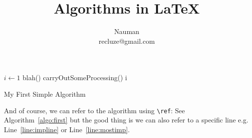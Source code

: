 \documentclass{article}
\begin{document}
\title{Algorithms in \LaTeX}
\author{Nauman \\ recluze@gmail.com}
\maketitle



\begin{algorithm}
\begin{algorithmic}[2]
  \STATE $i\gets1$
\ELSE 
   \label{line:impline}
     \STATE blah()
     \STATE carryOutSomeProcessing() \label{line:mostimp}
   \ENDFOR
  \ENDIF
\ENDIF
\RETURN i
\end{algorithmic}
\caption{My First Simple Algorithm}
\label{algo:first}
\end{algorithm}

And of course, we can refer to the algorithm using \verb|\ref|: See Algorithm~\ref{algo:first} but the good thing is we can also refer to a specific line e.g. Line~\ref{line:impline} or Line~\ref{line:mostimp}.
\end{document}
